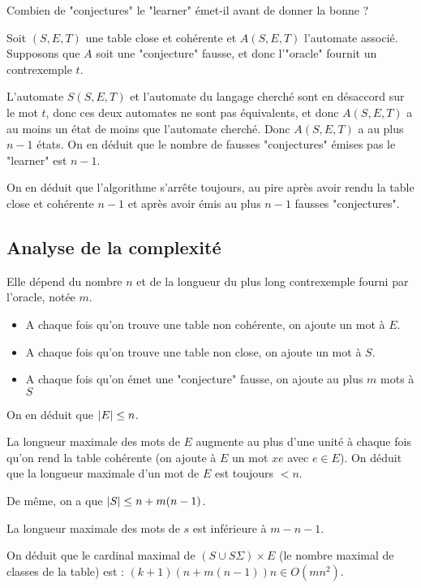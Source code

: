 Combien de "conjectures" le "learner" émet-il avant de donner la bonne ?

Soit $(S,E,T)$ une table close et cohérente et $A(S,E,T)$ l'automate associé.
Supposons que $A$ soit une "conjecture" fausse, et donc l'"oracle" fournit un contrexemple $t$.

L'automate $S(S,E,T)$ et l'automate du langage cherché sont en désaccord sur le mot $t$, donc ces deux automates
ne sont pas équivalents, et donc $A(S,E,T)$ a au moins un état de moins que l'automate cherché.
Donc $A(S,E,T)$ a au plus $n-1$ états. On en déduit que le nombre de fausses "conjectures" émises pas le "learner" est $n-1$.

On en déduit que l'algorithme s'arrête toujours, au pire après avoir rendu la table close et
cohérente $n-1$ et après avoir émis au plus $n-1$ fausses "conjectures".


\subsection{Analyse de la complexité}

Elle dépend du nombre $n$ et de la longueur du plus long contrexemple fourni par l'oracle, notée $m$.


\begin{itemize}
	\item A chaque fois qu'on trouve une table non cohérente, on ajoute un mot à $E$.
	\item A chaque fois qu'on trouve une table non close, on ajoute un mot à $S$.
	\item A chaque fois qu'on émet une "conjecture" fausse, on ajoute au plus $m$ mots à $S$
\end{itemize}

On en déduit que $\left|E\right| \leq n$.

La longueur maximale des mots de $E$ augmente au plus d'une unité à chaque fois qu'on rend la table cohérente
(on ajoute à $E$ un mot $xe$ avec $e \in E$). On déduit que la longueur maximale d'un mot de $E$ est toujours $<n$.

De même, on a que  $\left|S\right| \leq n + m(n-1)$. %

La longueur maximale des mots de $s$ est inférieure à $m - n -1$.


On déduit que le cardinal maximal de $(S \cup S \Sigma) \times E$ (le nombre maximal de classes de la table) est : $(k+1)(n+m(n-1))n \in O(mn^2)$.


